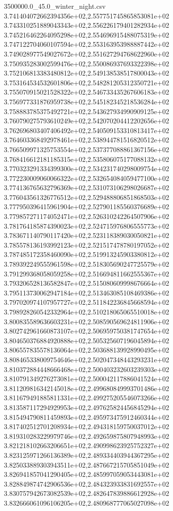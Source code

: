\begin{filecontents*}{3500000.0_45.0_winter_night.csv}
3.741404072662394356e+02,2.557751745865853081e+02
3.743310251889043343e+02,2.556226179401282934e+02
3.745216462264095298e+02,2.554696915488075319e+02
3.747122704060107594e+02,2.553163953988887442e+02
3.749028977549027672e+02,2.551627294768622960e+02
3.750935283002599476e+02,2.550086937693322398e+02
3.752106813383480812e+02,2.549138538517800043e+02
3.753164534532601806e+02,2.548281205312350721e+02
3.755070915021528322e+02,2.546733435267606183e+02
3.756977331876959738e+02,2.545182345218536284e+02
3.758883785375492721e+02,2.543627934990909125e+02
3.760790275793610249e+02,2.542070204412202656e+02
3.762696803407406492e+02,2.540509153310813417e+02
3.764603368492978461e+02,2.538944781516820512e+02
3.766509971325753554e+02,2.537377088861367156e+02
3.768416612181185315e+02,2.535806075177088132e+02
3.770323291334399300e+02,2.534231740298009754e+02
3.772230009060066322e+02,2.532654084059477100e+02
3.774136765632796369e+02,2.531073106298026687e+02
3.776043561326776512e+02,2.529488806851868503e+02
3.777950396415961904e+02,2.527901185560376689e+02
3.779857271174052471e+02,2.526310242264507906e+02
3.781764185874390023e+02,2.524715976806555773e+02
3.783671140790117420e+02,2.523118389030050821e+02
3.785578136193992123e+02,2.521517478780197052e+02
3.787485172358460090e+02,2.519913245903380812e+02
3.789392249555961598e+02,2.518305690247725579e+02
3.791299368058059258e+02,2.516694811662555367e+02
3.793206528136582847e+02,2.515080609998676664e+02
3.795113730062947184e+02,2.513463085108469386e+02
3.797020974107957727e+02,2.511842236845668594e+02
3.798928260542332964e+02,2.510218065065510018e+02
3.800835589636603231e+02,2.508590569624811906e+02
3.802742961660873107e+02,2.506959750381747654e+02
3.804650376884920888e+02,2.505325607196045894e+02
3.806557835578136064e+02,2.503688139928990495e+02
3.808465338009754646e+02,2.502047348443293231e+02
3.810372884448666468e+02,2.500403232603239303e+02
3.810791349276273081e+02,2.500042117886041524e+02
3.811209816342145018e+02,2.499680849993701486e+02
3.811679491885811331e+02,2.499275205546073266e+02
3.813587117294929953e+02,2.497625824456845294e+02
3.815494790811459893e+02,2.495973475912460344e+02
3.817402512701208934e+02,2.494318159750037012e+02
3.819310283229979746e+02,2.492659875807948993e+02
3.821218102663206651e+02,2.490998623925752327e+02
3.823125971266136389e+02,2.489334403944367295e+02
3.825033889303943511e+02,2.487667215705851049e+02
3.826941857041290405e+02,2.485997059053443081e+02
3.828849874742906536e+02,2.484323933831692557e+02
3.830757942673082539e+02,2.482647839886612928e+02
3.832666061096106205e+02,2.480968777065027098e+02

\end{filecontents*}
